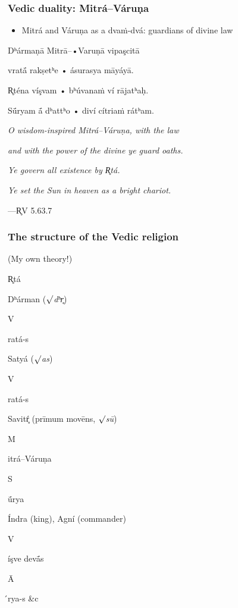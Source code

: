 \documentclass[pdf]{beamer}
\newcommand{\Subitem}[1]{{\setlength\itemindent{12pt} \item[-] #1}}
\newcommand{\Subsubitem}[1]{{\setlength\itemindent{24pt} \item[○] #1}}
\begin{document}
\begin{frame} \frametitle{Vedic duality: Mitrá--Váruṇa}
\begin{itemize}
	\item Mitrá and Váruṇa as a dvaṁ-dvá: guardians of divine law
\end{itemize}
\begin{center}
	Dʰármaṇā Mitrā--•Varuṇā vipaşcitā

	vratā́ rakṣetʰe • ásurasya māyáyā.

	R̥téna víşvam • bʰúvanaṁ ví rājatʰaḥ.

	Sū́ryam ā́ dʰattʰo • diví cítriaṁ rátʰam.

	\vspace{12pt}

	\textit{O wisdom-inspired Mitrá--Váruṇa, with the law}

	\textit{and with the power of the divine ye guard oaths.}

	\textit{Ye govern all existence by R̥tá.}

	\textit{Ye set the Sun in heaven as a bright chariot.}

	\vspace{12pt}

 	---R̥V 5.63.7
\end{center}
\end{frame}

\begin{frame} \frametitle{The structure of the Vedic religion}
(My own theory!)
\begin{itemize}
	\item R̥tá 
	\Subitem {Dʰárman ($\surd$\textit{dʰr̥})}
	\Subsubitem Vratá-s
	\Subitem {Satyá ($\surd$\textit{as})}
	\Subsubitem Vratá-s
\end{itemize}
\begin{itemize}
	\item {Savitŕ̥ (prīmum movēns, $\surd$\textit{sū})}
	\Subitem Mitrá--Váruṇa
	\Subsubitem Sū́rya
	\item Índra (king), Agní (commander)
	\Subitem Víşve devā́s
	\Subsubitem Ā́rya-s \&c
\end{itemize}
\end{frame}
\end{document}
